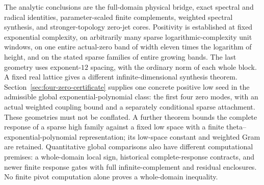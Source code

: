 \documentclass[11pt,a4paper]{article}
\numberwithin{equation}{section}
\theoremstyle{definition}\newtheorem{definition}[theorem]{Definition}
\theoremstyle{remark}\newtheorem{remark}[theorem]{Remark}
\begin{document}
The analytic conclusions are the full-domain physical bridge, exact spectral and radical identities, parameter-scaled finite complements, weighted spectral synthesis, and stronger-topology zero-jet cores. Positivity is established at fixed exponential complexity, on arbitrarily many sparse logarithmic-complexity unit windows, on one entire actual-zero band of width eleven times the logarithm of height, and on the stated sparse families of entire growing bands. The last geometry uses exponent-$12$ spacing, with the ordinary norm of each whole block. A fixed real lattice gives a different infinite-dimensional synthesis theorem. Section~\ref{sec:four-zero-certificate} supplies one concrete positive low seed in the admissible global exponential-polynomial class: the first four zero modes, with an actual weighted coupling bound and a separately conditional sparse attachment. These geometries must not be conflated. A further theorem bounds the complete response of a sparse high family against a fixed low space with a finite theta--exponential-polynomial representation; its low-space constant and weighted Gram are retained. Quantitative global comparisons also have different computational premises: a whole-domain local sign, historical complete-response contracts, and newer finite response gates with full infinite-complement and residual enclosures. No finite pivot computation alone proves a whole-domain inequality.
\end{document}
